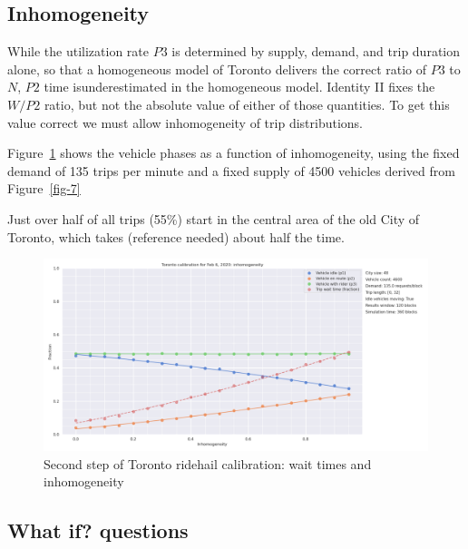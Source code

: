 \documentclass[
  letterpaper,
]{article}
\begin{document}
\hypertarget{inhomogeneity}{%
\subsection{Inhomogeneity}\label{inhomogeneity}}

While the utilization rate \(P3\) is determined by supply, demand, and
trip duration alone, so that a homogeneous model of Toronto delivers the
correct ratio of \(P3\) to \(N\), \(P2\) time isunderestimated in the
homogeneous model. Identity II fixes the \(W/P2\) ratio, but not the
absolute value of either of those quantities. To get this value correct
we must allow inhomogeneity of trip distributions.

Figure~\ref{fig-inhomog} shows the vehicle phases as a function of
inhomogeneity, using the fixed demand of 135 trips per minute and a
fixed supply of 4500 vehicles derived from Figure~\ref{fig-7}

Just over half of all trips (55\%) start in the central area of the old
City of Toronto, which takes (reference needed) about half the time.

\begin{figure}

{\centering \includegraphics{toronto_calibration_inhomogeneous.png}

}

\caption{\label{fig-inhomog}Second step of Toronto ridehail calibration:
wait times and inhomogeneity}

\end{figure}

\hypertarget{what-if-questions}{%
\subsection{What if? questions}\label{what-if-questions}}
\end{document}
